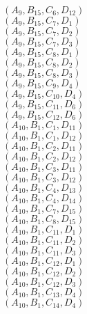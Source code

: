 \documentclass[14pt]{article}
\begin{document}
    $({A}_{9}, {B}_{15}, {C}_{6}, {D}_{12}) $ \\ 
    $({A}_{9}, {B}_{15}, {C}_{7}, {D}_{1}) $ \\ 
    $({A}_{9}, {B}_{15}, {C}_{7}, {D}_{2}) $ \\ 
    $({A}_{9}, {B}_{15}, {C}_{7}, {D}_{3}) $ \\ 
    $({A}_{9}, {B}_{15}, {C}_{8}, {D}_{1}) $ \\ 
    $({A}_{9}, {B}_{15}, {C}_{8}, {D}_{2}) $ \\ 
    $({A}_{9}, {B}_{15}, {C}_{8}, {D}_{3}) $ \\ 
    $({A}_{9}, {B}_{15}, {C}_{9}, {D}_{4}) $ \\ 
    $({A}_{9}, {B}_{15}, {C}_{10}, {D}_{4}) $ \\ 
    $({A}_{9}, {B}_{15}, {C}_{11}, {D}_{6}) $ \\ 
    $({A}_{9}, {B}_{15}, {C}_{12}, {D}_{6}) $ \\ 
    $({A}_{10}, {B}_{1}, {C}_{1}, {D}_{11}) $ \\ 
    $({A}_{10}, {B}_{1}, {C}_{1}, {D}_{12}) $ \\ 
    $({A}_{10}, {B}_{1}, {C}_{2}, {D}_{11}) $ \\ 
    $({A}_{10}, {B}_{1}, {C}_{2}, {D}_{12}) $ \\ 
    $({A}_{10}, {B}_{1}, {C}_{3}, {D}_{11}) $ \\ 
    $({A}_{10}, {B}_{1}, {C}_{3}, {D}_{12}) $ \\ 
    $({A}_{10}, {B}_{1}, {C}_{4}, {D}_{13}) $ \\ 
    $({A}_{10}, {B}_{1}, {C}_{4}, {D}_{14}) $ \\ 
    $({A}_{10}, {B}_{1}, {C}_{7}, {D}_{15}) $ \\ 
    $({A}_{10}, {B}_{1}, {C}_{8}, {D}_{15}) $ \\ 
    $({A}_{10}, {B}_{1}, {C}_{11}, {D}_{1}) $ \\ 
    $({A}_{10}, {B}_{1}, {C}_{11}, {D}_{2}) $ \\ 
    $({A}_{10}, {B}_{1}, {C}_{11}, {D}_{3}) $ \\ 
    $({A}_{10}, {B}_{1}, {C}_{12}, {D}_{1}) $ \\ 
    $({A}_{10}, {B}_{1}, {C}_{12}, {D}_{2}) $ \\ 
    $({A}_{10}, {B}_{1}, {C}_{12}, {D}_{3}) $ \\ 
    $({A}_{10}, {B}_{1}, {C}_{13}, {D}_{4}) $ \\ 
    $({A}_{10}, {B}_{1}, {C}_{14}, {D}_{4}) $ \\ 
\end{document}

